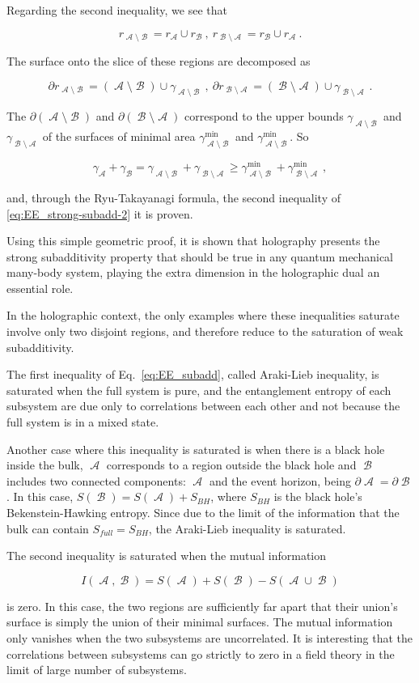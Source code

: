 \documentclass[twocolumn]{revtex4}
\providecommand{\eq}[2]{
    \begin{equation}
        #2
    \label{eq:#1}
    \end{equation}
}
\DeclareMathOperator{\calA}{\mathcal{A}}
\DeclareMathOperator{\calB}{\mathcal{B}}
\begin{document}
Regarding the second inequality, we see that
\eq{SS_r-2}{
    r_{\calA \setminus \calB} = r_{\calA} \cup r_{\calB} \ , \ r_{\calB \setminus \calA} = r_{\calB} \cup r_{\calA} \ .
}
The surface onto the slice of these regions are decomposed as
\eq{SS_dr-2}{
    \partial r_{\calA \setminus \calB} = (\calA \setminus \calB) \cup \gamma_{\calA \setminus \calB} \ , \ \partial r_{\calB \setminus \calA } = (\calB \setminus \calA) \cup \gamma_{\calB \setminus \calA} \ .
}
The $\partial (\calA \setminus \calB)$ and $\partial (\calB \setminus \calA)$ correspond to the upper bounds $\gamma_{\calA \setminus \calB}$ and $\gamma_{\calB \setminus \calA}$ of the surfaces of minimal area $\gamma^{\text{min}}_{\calA \setminus \calB}$ and $\gamma^{\text{min}}_{\calA \setminus \calB}$. So
\eq{SS_gamma-2}{
    \gamma_{\calA} + \gamma_{\calB} = \gamma_{\calA \setminus \calB} + \gamma_{\calB \setminus \calA} \ge \gamma^{\text{min}}_{\calA \setminus \calB} + \gamma^{\text{min}}_{\calB \setminus \calA} \ ,
}
and, through the Ryu-Takayanagi formula, the second inequality of \ref{eq:EE_strong-subadd-2} it is proven.

Using this simple geometric proof, it is shown that holography presents the strong subadditivity property that should be true in any quantum mechanical many-body system, playing the extra dimension in the holographic dual an essential role.

In the holographic context, the only examples where these inequalities saturate involve only two disjoint regions, and therefore reduce to the saturation of weak subadditivity.

The first inequality of Eq.~\ref{eq:EE_subadd}, called Araki-Lieb inequality, is saturated when the full system is pure, and the entanglement entropy of each subsystem are due only to correlations between each other and not because the full system is in a mixed state.

Another case where this inequality is saturated is when there is a black hole inside the bulk, $\calA$ corresponds to a region outside the black hole and $\calB$ includes two connected components: $\calA$ and the event horizon, being $\partial \calA = \partial \calB$. In this case, $S(\calB) = S(\calA) + S_{BH}$, where $S_{BH}$ is the black hole's Bekenstein-Hawking entropy. Since due to the limit of the information that the bulk can contain $S_{full} = S_{BH}$, the Araki-Lieb inequality is saturated.

The second inequality is saturated when the mutual information
\eq{Mutual-Info}{
    I(\calA,\calB) = S(\calA) + S(\calB) - S(\calA \cup \calB)
}
is zero. In this case, the two regions are sufficiently far apart that their union's surface is simply the union of their minimal surfaces. The mutual information only vanishes when the two subsystems are uncorrelated. It is interesting that the correlations between subsystems can go strictly to zero in a field theory in the limit of large number of subsystems.
\end{document}
